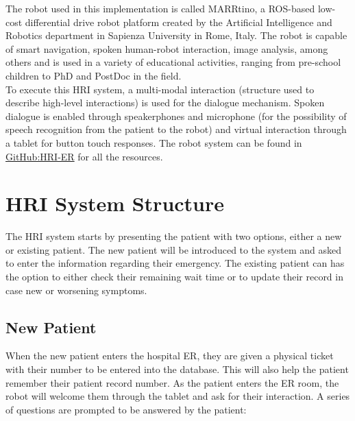 \documentclass[letterpaper]{article}
\begin{document}
The robot used in this implementation is called MARRtino, a ROS-based low-cost differential drive robot platform created by the Artificial Intelligence and Robotics department in Sapienza University in Rome, Italy. The robot is capable of smart navigation, spoken human-robot interaction, image analysis, among others and is used in a variety of educational activities, ranging from pre-school children to PhD and PostDoc in the field.\\

To execute this HRI system, a multi-modal interaction (structure used to describe high-level interactions) is used for the dialogue mechanism. Spoken dialogue is enabled through speakerphones and microphone (for the possibility of speech recognition from the patient to the robot) and virtual interaction through a tablet for button touch responses. The robot system can be found in \href{https://github.com/ccapontep/HumanRobotInteraction_ER}{GitHub:HRI-ER} for all the resources. \\

\section{HRI System Structure}
The HRI system starts by presenting the patient with two options, either a new or existing patient. The new patient will be introduced to the system and asked to enter the information regarding their emergency. The existing patient can has the option to either check their remaining wait time or to update their record in case new or worsening symptoms. 

\subsection{New Patient}
When the new patient enters the hospital ER, they are given a physical ticket with their number to be entered into the database. This will also help the patient remember their patient record number. As the patient enters the ER room, the robot will welcome them through the tablet and ask for their interaction. A series of questions are prompted to be answered by the patient:
\end{document}
